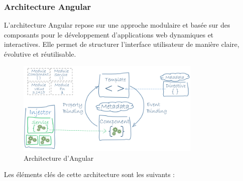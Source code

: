 \subsubsection{Architecture Angular}

L’architecture Angular repose sur une approche modulaire et basée sur des composants pour le développement d’applications web dynamiques et interactives. Elle permet de structurer l’interface utilisateur de manière claire, évolutive et réutilisable.

\begin{figure}[H]
    \centering
    \includegraphics[width=0.8\textwidth]{figures/angular architecture.png}
    \caption{Architecture d’Angular}
    \label{fig:architecture_angular}
\end{figure}

Les éléments clés de cette architecture sont les suivants :

